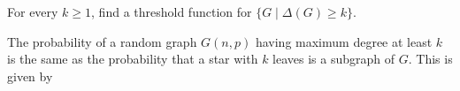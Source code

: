 \question For every \(k \geq 1\), find a threshold function for
\(\{G \mid \Delta(G) \geq k\}\).

\begin{solution}
  The probability of a random graph \(G(n, p)\) having maximum
  degree at least \(k\) is the same as the probability that a star
  with \(k\) leaves is a subgraph of \(G\). This is given by
\end{solution}
